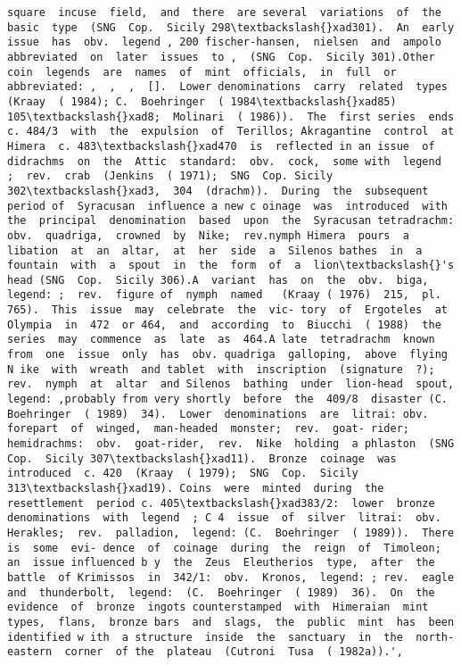 \documentclass[11pt]{article}
\begin{document}
\begin{Verbatim}[commandchars=\\\{\}]
square  incuse  field,  and  there  are several  variations  of  the  basic  type  (SNG  Cop.  Sicily 298\textbackslash{}xad301).  An  early  issue  has  obv.  legend , 200 fischer-hansen,  nielsen  and  ampolo abbreviated  on  later  issues  to ,  (SNG  Cop.  Sicily 301).Other  coin  legends  are  names  of  mint  officials,  in  full  or abbreviated: ,  ,  ,  [].  Lower denominations  carry  related  types  (Kraay  ( 1984); C.  Boehringer  ( 1984\textbackslash{}xad85)  105\textbackslash{}xad8;  Molinari  ( 1986)).  The  first series  ends  c. 484/3  with  the  expulsion  of  Terillos; Akragantine  control  at  Himera  c. 483\textbackslash{}xad470  is  reflected in an issue  of  didrachms  on  the  Attic  standard:  obv.  cock,  some with  legend  ;  rev.  crab  (Jenkins  ( 1971);  SNG  Cop. Sicily 302\textbackslash{}xad3,  304  (drachm)).  During  the  subsequent  period of  Syracusan  influence a new c oinage  was  introduced  with the  principal  denomination  based  upon  the  Syracusan tetradrachm:  obv.  quadriga,  crowned  by  Nike;  rev.nymph Himera  pours  a  libation  at  an  altar,  at  her  side  a  Silenos bathes  in  a  fountain  with  a  spout  in  the  form  of  a  lion\textbackslash{}'s  head (SNG  Cop.  Sicily 306).A  variant  has  on  the  obv.  biga,  legend: ;  rev.  figure of  nymph  named   (Kraay ( 1976)  215,  pl. 765).  This  issue  may  celebrate  the  vic- tory  of  Ergoteles  at  Olympia  in  472  or 464,  and  according  to  Biucchi  ( 1988)  the  series  may  commence  as  late  as  464.A late  tetradrachm  known  from  one  issue  only  has  obv. quadriga  galloping,  above  flying N ike  with  wreath  and tablet  with  inscription  (signature  ?);  rev.  nymph  at  altar  and Silenos  bathing  under  lion-head  spout,  legend: ,probably from very shortly  before  the  409/8  disaster (C.  Boehringer  ( 1989)  34).  Lower  denominations  are  litrai: obv.  forepart  of  winged,  man-headed  monster;  rev.  goat- rider;  hemidrachms:  obv.  goat-rider,  rev.  Nike  holding  a phlaston  (SNG  Cop.  Sicily 307\textbackslash{}xad11).  Bronze  coinage  was introduced  c. 420  (Kraay  ( 1979);  SNG  Cop.  Sicily 313\textbackslash{}xad19). Coins  were  minted  during  the  resettlement  period c. 405\textbackslash{}xad383/2:  lower  bronze  denominations  with  legend  ; C 4  issue  of  silver  litrai:  obv.  Herakles;  rev.  palladion,  legend: (C.  Boehringer  ( 1989)).  There  is  some  evi- dence  of  coinage  during  the  reign  of  Timoleon;  an  issue influenced b y  the  Zeus  Eleutherios  type,  after  the  battle  of Krimissos  in  342/1:  obv.  Kronos,  legend: ; rev.  eagle  and  thunderbolt,  legend:  (C.  Boehringer  ( 1989)  36).  On  the  evidence  of  bronze  ingots counterstamped  with  Himeraian  mint  types,  flans,  bronze bars  and  slags,  the  public  mint  has  been  identified w ith  a structure  inside  the  sanctuary  in  the  north-eastern  corner  of the  plateau  (Cutroni  Tusa  ( 1982a)).',

\end{Verbatim}
\end{document}
